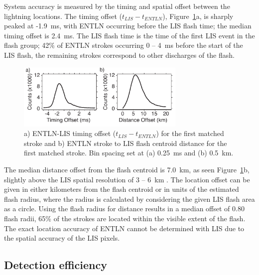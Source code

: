 System accuracy is measured by the timing and spatial offset between the lightning locations.
The timing offset ($t_{LIS} - t_{ENTLN}$), Figure~\ref{entln_lis:fig:accuracy}a, is sharply peaked at -1.9~ms, with ENTLN occurring before the LIS flash time; the median timing offset is 2.4~ms.
The LIS flash time is the time of the first LIS event in the flash group; 42\% of ENTLN strokes occurring 0 -- 4~ms before the start of the LIS flash, the remaining strokes correspond to other discharges of the flash.

\begin{figure}[t]
   \centering
   \noindent\includegraphics[width=19pc,angle=0]{entln_lis/Figures/accuracy.pdf}
   \caption{a) ENTLN-LIS timing offset ($t_{LIS} - t_{ENTLN}$) for the first matched stroke and
   		b) ENTLN stroke to LIS flash centroid distance for the first matched stroke.
   		Bin spacing set at (a) 0.25~ms and (b) 0.5~km.}
   \label{entln_lis:fig:accuracy}
\end{figure}

The median distance offset from the flash centroid is 7.0~km, as seen Figure~\ref{entln_lis:fig:accuracy}b, slightly above the LIS spatial resolution of 3 -- 6~km \citep{Christian1999}.
The location offset can be given in either kilometers from the flash centroid or in units of the estimated flash radius, where the radius is calculated by considering the given LIS flash area as a circle.
Using the flash radius for distance results in a median offset of 0.80 flash radii, 65\% of the strokes are located within the visible extent of the flash.
The exact location accuracy of ENTLN cannot be determined with LIS due to the spatial accuracy of the LIS pixels.

\subsection{Detection efficiency}

